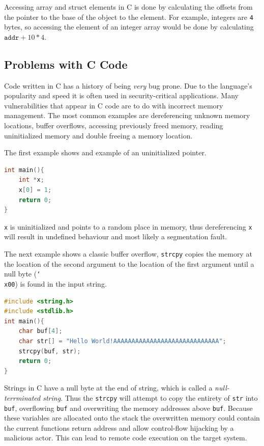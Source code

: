 Accessing array and struct elements in C is done by calculating the offsets from the pointer to the base of the object to the element. For example, integers are \texttt{4} bytes, so accessing the  element of an integer array would be done by calculating $\texttt{addr} + 10*4$.


\subsection{Problems with C Code}

Code written in C has a history of being \textit{very} bug prone\cite{common-bugs}. Due to the language's popularity and speed it is often used in security-critical applications. Many vulnerabilities that appear in C code are to do with incorrect memory management. The most common examples are dereferencing unknown memory locations, buffer overflows, accessing previously freed memory, reading uninitialized memory and double freeing a memory location.

The first example shows and example of an uninitialized pointer.

\begin{lstlisting}[language=C, caption=Dereference unknown memory location]
int main(){
    int *x;
    x[0] = 1;
    return 0;
}
\end{lstlisting}

\texttt{x} is uninitialized and points to a random place in memory, thus dereferencing \texttt{x} will result in undefined behaviour and most likely a segmentation fault.

The next example shows a classic buffer overflow, \texttt{strcpy} copies the memory at the location of the second argument to the location of the first argument until a null byte (\texttt{\char`\\x00}) is found in the input string.

\begin{lstlisting}[language=C, caption=Buffer overflow]
#include <string.h>
#include <stdlib.h>
int main(){
    char buf[4];
    char str[] = "Hello World!AAAAAAAAAAAAAAAAAAAAAAAAAAAAA";
    strcpy(buf, str);
    return 0;
}
\end{lstlisting}

Strings in C have a null byte at the end of string, which is called a \textit{null-terrminated string}. Thus the \texttt{strcpy} will attempt to copy the entirety of \texttt{str} into \texttt{buf}, overflowing \texttt{buf} and overwriting the memory addresses above \texttt{buf}. Because these variables are allocated onto the stack the overwritten memory could contain the current functions return address and allow control-flow hijacking by a malicious actor. This can lead to remote code execution on the target system.


